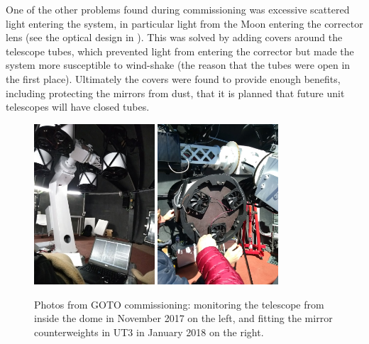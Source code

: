 \begin{colsection}
\begin{colsection}
\newpage

One of the other problems found during commissioning was excessive scattered light entering the system, in particular light from the Moon entering the corrector lens (see the optical design in ). This was solved by adding covers around the telescope tubes, which prevented light from entering the corrector but made the system more susceptible to wind-shake (the reason that the tubes were open in the first place). Ultimately the covers were found to provide enough benefits, including protecting the mirrors from dust, that it is planned that future unit telescopes will have closed tubes.

\begin{figure}[t]
    \begin{center}
        \includegraphics[width=0.4\textwidth]{images/commissioning_photo.jpg}
        \includegraphics[width=0.4\textwidth]{images/commissioning_photo3.jpg}
    \end{center}
    \caption[Photos from GOTO commissioning]{
        Photos from GOTO commissioning: monitoring the telescope from inside the dome in November 2017 on the left, and fitting the mirror counterweights in UT3 in January 2018 on the right.
    }\label{fig:commissioning}
\end{figure}


\end{colsection}
\end{colsection}
